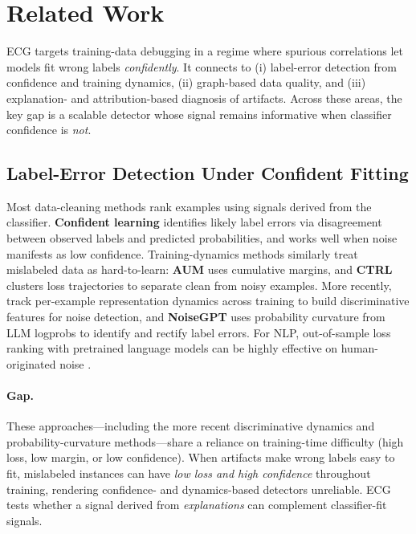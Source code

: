 \documentclass[letterpaper]{article}
\begin{document}
\section{Related Work}
\label{sec:related}

ECG targets training-data debugging in a regime where spurious correlations let models fit wrong labels \emph{confidently}.
It connects to (i) label-error detection from confidence and training dynamics, (ii) graph-based data quality, and (iii) explanation- and attribution-based diagnosis of artifacts.
Across these areas, the key gap is a scalable detector whose signal remains informative when classifier confidence is \emph{not}.

\subsection{Label-Error Detection Under Confident Fitting}

Most data-cleaning methods rank examples using signals derived from the classifier.
\textbf{Confident learning} \citep{northcutt2021confident} identifies likely label errors via disagreement between observed labels and predicted probabilities, and works well when noise manifests as low confidence.
Training-dynamics methods similarly treat mislabeled data as hard-to-learn: \textbf{AUM} \citep{pleiss2020identifying} uses cumulative margins, and \textbf{CTRL} \citep{yue2022ctrl} clusters loss trajectories to separate clean from noisy examples.
More recently, \citet{kim2024discriminative} track per-example representation dynamics across training to build discriminative features for noise detection, and \textbf{NoiseGPT} \citep{wang2024noisegpt} uses probability curvature from LLM logprobs to identify and rectify label errors.
For NLP, out-of-sample loss ranking with pretrained language models can be highly effective on human-originated noise \citep{chong2022detecting}.

\paragraph{Gap.}
These approaches---including the more recent discriminative dynamics \citep{kim2024discriminative} and probability-curvature \citep{wang2024noisegpt} methods---share a reliance on training-time difficulty (high loss, low margin, or low confidence).
When artifacts make wrong labels easy to fit, mislabeled instances can have \emph{low loss and high confidence} throughout training, rendering confidence- and dynamics-based detectors unreliable.
ECG tests whether a signal derived from \emph{explanations} can complement classifier-fit signals.
\end{document}
